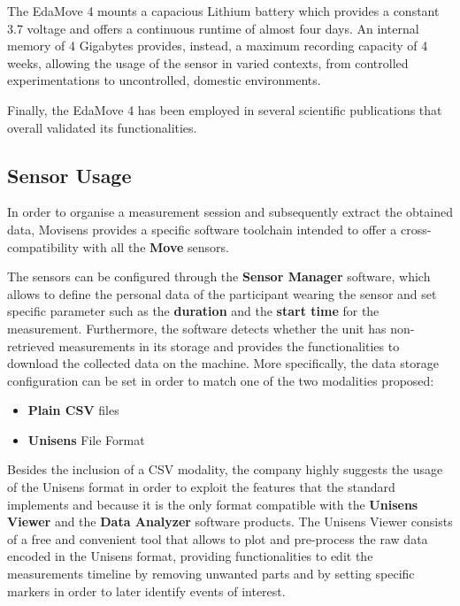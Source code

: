 The EdaMove 4 mounts a capacious Lithium battery which provides a constant 3.7 voltage and offers a continuous runtime of almost four days. An internal memory of 4 Gigabytes provides, instead, a maximum recording capacity of 4 weeks, allowing the usage of the sensor in varied contexts, from controlled experimentations to uncontrolled, domestic environments. 

Finally, the EdaMove 4 has been employed in several scientific publications that overall validated its functionalities.

\subsection{Sensor Usage}\label{subsec:edamove4-usage}

In order to organise a measurement session and subsequently extract the obtained data, Movisens provides a specific software toolchain intended to offer a cross-compatibility with all the \textbf{Move} sensors. 

The sensors can be configured through the \textbf{Sensor Manager} software, which allows to define the personal data of the participant wearing the sensor and set specific parameter such as the \textbf{duration} and the \textbf{start time} for the measurement. Furthermore, the software detects whether the unit has non-retrieved measurements in its storage and provides the functionalities to download the collected data on the machine. More specifically, the data storage configuration can be set in order to match one of the two modalities proposed: 

\begin{itemize}
    \item \textbf{Plain CSV} files
    \item \textbf{Unisens} File Format 
\end{itemize}

Besides the inclusion of a CSV modality, the company highly suggests the usage of the Unisens format in order to exploit the features that the standard implements and because it is the only format compatible with the \textbf{Unisens Viewer} and the \textbf{Data Analyzer} software products. The Unisens Viewer consists of a free and convenient tool that allows to plot and pre-process the raw data encoded in the Unisens format, providing functionalities to edit the measurements timeline by removing unwanted parts and by setting specific markers in order to later identify events of interest.

